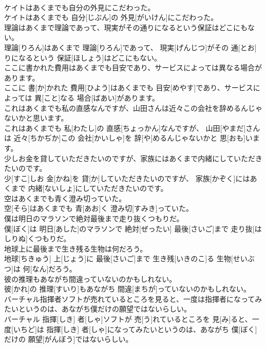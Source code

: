 \documentclass[8pt]{extreport}
\begin{document}
\begin{CJK}{UTF8}{min}
\\	ケイトはあくまでも自分の外見にこだわった。	
\\	ケイトはあくまでも 自分[じぶん]の 外見[がいけん]にこだわった。
\\	理論はあくまで理論であって、現実がその通りになるという保証はどこにもない。	
\\	理論[りろん]はあくまで 理論[りろん]であって、 現実[げんじつ]がその 通[とお]りになるという 保証[ほしょう]はどこにもない。
\\	ここに書かれた費用はあくまでも目安であり、サービスによっては異なる場合があります。	
\\	ここに 書[か]かれた 費用[ひよう]はあくまでも 目安[めやす]であり、サービスによっては 異[こと]なる 場合[ばあい]があります。
\\	これはあくまでも私の直感なんですが、山田さんは近々この会社を辞めるんじゃないかと思います。	
\\	これはあくまでも 私[わたし]の 直感[ちょっかん]なんですが、 山田[やまだ]さんは 近々[ちかぢか]この 会社[かいしゃ]を 辞[や]めるんじゃないかと 思[おも]います。
\\	少しお金を貸していただきたいのですが、家族にはあくまで内緒にしていただきたいのです。	
\\	少[すこ]しお 金[かね]を 貸[か]していただきたいのですが、 家族[かぞく]にはあくまで 内緒[ないしょ]にしていただきたいのです。
\\	空はあくまでも青く澄み切っていた。	
\\	空[そら]はあくまでも 青[あお]く 澄み切[すみき]っていた。
\\	僕は明日のマラソンで絶対最後まで走り抜くつもりだ。	
\\	僕[ぼく]は 明日[あした]のマラソンで 絶対[ぜったい] 最後[さいご]まで 走り抜[はしりぬ]くつもりだ。
\\	地球上に最後まで生き残る生物は何だろう。	
\\	地球[ちきゅう] 上[じょう]に 最後[さいご]まで 生き残[いきのこ]る 生物[せいぶつ]は 何[なん]だろう。
\\	彼の推理もあながち間違っていないのかもしれない。	
\\	彼[かれ]の 推理[すいり]もあながち 間違[まちが]っていないのかもしれない。
\\	バーチャル指揮者ソフトが売れているところを見ると、一度は指揮者になってみたいというのは、あながち僕だけの願望ではないらしい。	
\\	バーチャル 指揮[しき] 者[しゃ]ソフトが 売[う]れているところを 見[み]ると、一度[いちど]は 指揮[しき] 者[しゃ]になってみたいというのは、あながち 僕[ぼく]だけの 願望[がんぼう]ではないらしい。

\end{CJK}
\end{document}
